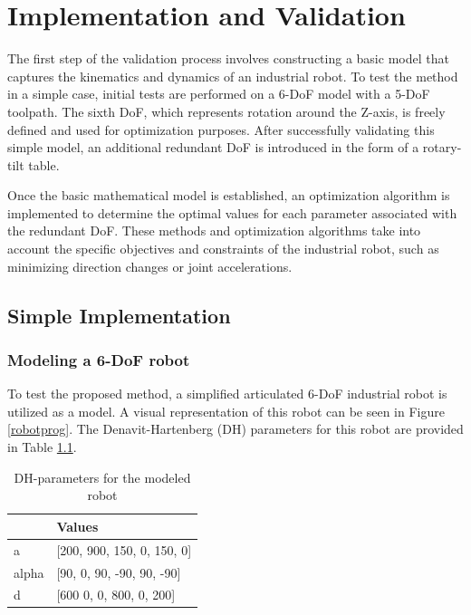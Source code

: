 \chapter{Implementation and Validation}%

The first step of the validation process involves constructing a basic model that captures the kinematics and dynamics of an industrial robot. To test the method in a simple case, initial tests are performed on a 6-\acrshort{DoF} model with a 5-\acrshort{DoF} toolpath. The sixth \acrshort{DoF}, which represents rotation around the Z-axis, is freely defined and used for optimization purposes. After successfully validating this simple model, an additional redundant \acrshort{DoF} is introduced in the form of a rotary-tilt table.

Once the basic mathematical model is established, an optimization algorithm is implemented to determine the optimal values for each parameter associated with the redundant \acrshort{DoF}. These methods and optimization algorithms take into account the specific objectives and constraints of the industrial robot, such as minimizing direction changes or joint accelerations.



\section{Simple Implementation}%
\subsection{Modeling a 6-DoF robot}
To test the proposed method, a simplified articulated 6-\acrshort{DoF} industrial robot is utilized as a model. A visual representation of this robot can be seen in Figure \ref{robotprog}. The Denavit-Hartenberg (\acrshort{DH}) parameters for this robot are provided in Table \ref{DHp}.

\begin{table}[H]
	\centering
	\begin{tabular}{||l|l||}
		  & Values \\
		\hline
		\hline
		\hline
		a	&		[200, 900, 150, 0,   150, 0] \\
		alpha	&  	[90,  0,   90,  -90, 90,  -90] \\
		d	& 		[600  0,   0,   800, 0,   200]\\
		
		\hline
		\hline
	\end{tabular}
	
	\caption{DH-parameters for the modeled robot}
	\label{DHp}
\end{table}

